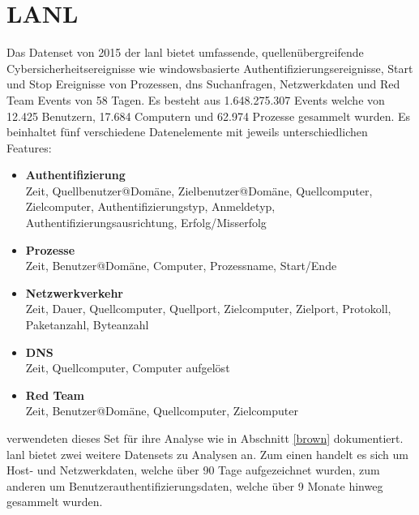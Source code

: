 \documentclass[
    12pt, %
    DIV10,
    ngerman, %
    a4paper, %
    oneside, %
    titlepage, %
    parskip=half, %
    headings=normal, %
    listof=totoc, %
    bibliography=totoc, %
    index=totoc, %
    captions=tableheading, %
    final %
]{scrreprt}
\begin{document}
\section{LANL}
Das Datenset von 2015 der \acl{lanl} \parencite{akent-2015-enterprise-data} bietet umfassende, quellenübergreifende Cybersicherheitsereignisse wie windowsbasierte Authentifizierungsereignisse, Start und Stop Ereignisse von Prozessen, \ac{dns} Suchanfragen, Netzwerkdaten und Red Team Events von 58 Tagen. Es besteht aus 1.648.275.307 Events welche von 12.425 Benutzern, 17.684 Computern und 62.974 Prozesse gesammelt wurden. Es beinhaltet fünf verschiedene Datenelemente mit jeweils unterschiedlichen Features:
\begin{itemize}
\item \textbf{Authentifizierung}\\ Zeit, Quellbenutzer@Domäne, Zielbenutzer@Domäne, Quellcomputer, Zielcomputer, Authentifizierungstyp, Anmeldetyp, Authentifizierungsausrichtung, Erfolg/Misserfolg
\item \textbf{Prozesse}\\ Zeit, Benutzer@Domäne, Computer, Prozessname, Start/Ende
\item \textbf{Netzwerkverkehr}\\ Zeit, Dauer, Quellcomputer, Quellport, Zielcomputer, Zielport, Protokoll, Paketanzahl, Byteanzahl
\item \textbf{DNS}\\ Zeit, Quellcomputer, Computer aufgelöst
\item \textbf{Red Team}\\ Zeit, Benutzer@Domäne, Quellcomputer, Zielcomputer
\end{itemize}
\textcite{Brown2018} verwendeten dieses Set für ihre Analyse wie in Abschnitt \ref{brown} dokumentiert.
\ac{lanl} bietet zwei weitere Datensets zu Analysen an. Zum einen handelt es sich um Host- und Netzwerkdaten, welche über 90 Tage aufgezeichnet wurden, zum anderen um Benutzerauthentifizierungsdaten, welche über 9 Monate hinweg gesammelt wurden.
\end{document}
